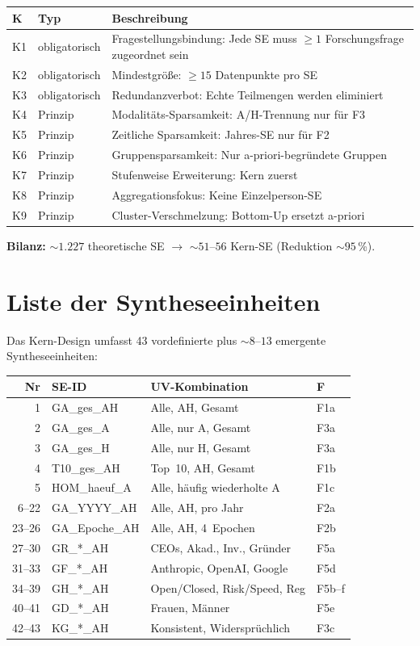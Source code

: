\documentclass[12pt,a4paper]{article}
\begin{document}
\begin{longtable}{l l p{8cm}}
  \toprule
  \textbf{K} & \textbf{Typ} & \textbf{Beschreibung} \\
  \midrule
  \endfirsthead
  K1 & obligatorisch & Fragestellungsbindung: Jede SE muss $\geq 1$ Forschungsfrage zugeordnet sein \\
  K2 & obligatorisch & Mindestgr\"o\ss{}e: $\geq 15$ Datenpunkte pro SE \\
  K3 & obligatorisch & Redundanzverbot: Echte Teilmengen werden eliminiert \\
  K4 & Prinzip & Modalit\"ats-Sparsamkeit: A/H-Trennung nur f\"ur F3 \\
  K5 & Prinzip & Zeitliche Sparsamkeit: Jahres-SE nur f\"ur F2 \\
  K6 & Prinzip & Gruppensparsamkeit: Nur a-priori-begr\"undete Gruppen \\
  K7 & Prinzip & Stufenweise Erweiterung: Kern zuerst \\
  K8 & Prinzip & Aggregationsfokus: Keine Einzelperson-SE \\
  K9 & Prinzip & Cluster-Verschmelzung: Bottom-Up ersetzt a-priori \\
  \bottomrule
\end{longtable}

\textbf{Bilanz:} ${\sim}1.227$ theoretische SE $\to$ ${\sim}51$--$56$ Kern-SE (Reduktion ${\sim}95$\,\%).


\section{Liste der Syntheseeinheiten}
\label{app:se}

Das Kern-Design umfasst 43 vordefinierte plus ${\sim}8$--$13$ emergente Syntheseeinheiten:

{\small
\begin{longtable}{r l l l}
  \toprule
  \textbf{Nr} & \textbf{SE-ID} & \textbf{UV-Kombination} & \textbf{F} \\
  \midrule
  \endfirsthead
  1 & GA\_ges\_AH & Alle, AH, Gesamt & F1a \\
  2 & GA\_ges\_A & Alle, nur A, Gesamt & F3a \\
  3 & GA\_ges\_H & Alle, nur H, Gesamt & F3a \\
  4 & T10\_ges\_AH & Top~10, AH, Gesamt & F1b \\
  5 & HOM\_haeuf\_A & Alle, h\"aufig wiederholte A & F1c \\
  6--22 & GA\_YYYY\_AH & Alle, AH, pro Jahr & F2a \\
  23--26 & GA\_Epoche\_AH & Alle, AH, 4~Epochen & F2b \\
  27--30 & GR\_*\_AH & CEOs, Akad., Inv., Gr\"under & F5a \\
  31--33 & GF\_*\_AH & Anthropic, OpenAI, Google & F5d \\
  34--39 & GH\_*\_AH & Open/Closed, Risk/Speed, Reg & F5b--f \\
  40--41 & GD\_*\_AH & Frauen, M\"anner & F5e \\
  42--43 & KG\_*\_AH & Konsistent, Widerspr\"uchlich & F3c \\
  \bottomrule
\end{longtable}
}
\end{document}

